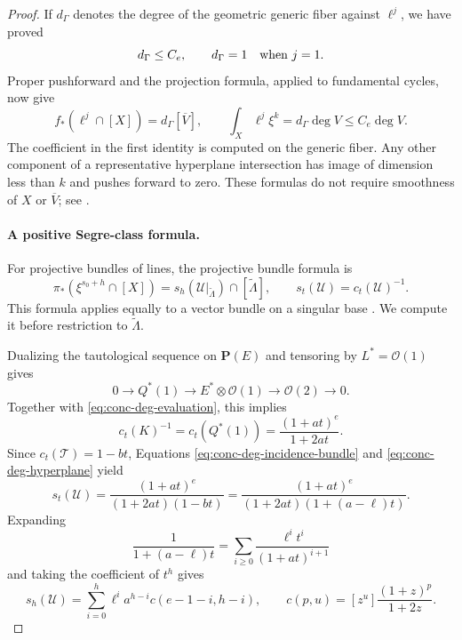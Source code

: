 \begin{proof}
If $d_\Gamma$ denotes the degree of the geometric generic fiber against $\ell^j$, we have proved
\begin{equation}
 d_\Gamma\le C_e,
 \qquad d_\Gamma=1\quad\hbox{when }j=1.
 \label{eq:conc-deg-fiber-degree}
\end{equation}
Proper pushforward and the projection formula, applied to fundamental cycles, now give
\begin{equation}
 f_*(\ell^j\cap[X])=d_\Gamma[\overline V],
 \qquad
 \int_X\ell^j\xi^k=d_\Gamma\deg V\le C_e\deg V.
 \label{eq:conc-deg-point-integral}
\end{equation}
The coefficient in the first identity is computed on the generic fiber.  Any other component of a representative hyperplane intersection has image of dimension less than $k$ and pushes forward to zero.  These formulas do not require smoothness of $X$ or $\overline V$; see \cite[Sections 1.4, 2.3, 2.5]{Ful}.

\paragraph{A positive Segre-class formula.}
For projective bundles of lines, the projective bundle formula is
\begin{equation}
 \pi_*(\xi^{s_0+h}\cap[X])
   =s_h(\mathcal{U}|_{\widetilde\Lambda})
      \cap[\widetilde\Lambda],
 \qquad s_t(\mathcal{U})=c_t(\mathcal{U})^{-1}.
 \label{eq:conc-deg-projective-bundle}
\end{equation}
This formula applies equally to a vector bundle on a singular base \cite[Sections 3.1--3.3]{Ful}.  We compute it before restriction to $\widetilde\Lambda$.

Dualizing the tautological sequence on $\mathbf{P}(E)$ and tensoring by $L^*=\mathcal{O}(1)$ gives
\[
 0\longrightarrow Q^*(1)
 \longrightarrow E^*\otimes\mathcal{O}(1)
 \longrightarrow\mathcal{O}(2)\longrightarrow0.
\]
Together with \eqref{eq:conc-deg-evaluation}, this implies
\[
 c_t(K)^{-1}=c_t(Q^*(1))=\frac{(1+at)^e}{1+2at}.
\]
Since $c_t(\mathcal{T})=1-bt$, Equations \eqref{eq:conc-deg-incidence-bundle} and \eqref{eq:conc-deg-hyperplane} yield
\begin{equation}
 s_t(\mathcal{U})
   =\frac{(1+at)^e}{(1+2at)(1-bt)}
   =\frac{(1+at)^e}{(1+2at)(1+(a-\ell)t)}.
 \label{eq:conc-deg-segre-series}
\end{equation}
Expanding
\[
 \frac{1}{1+(a-\ell)t}
   =\sum_{i\ge0}\frac{\ell^i t^i}{(1+at)^{i+1}}
\]
and taking the coefficient of $t^h$ gives
\begin{equation}
 s_h(\mathcal{U})
 =\sum_{i=0}^h \ell^i a^{h-i}c(e-1-i,h-i),
 \qquad
 c(p,u)=[z^u]\frac{(1+z)^p}{1+2z}.
 \label{eq:conc-deg-segre-coefficients}
\end{equation}


\end{proof}
